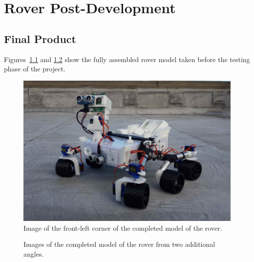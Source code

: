 \chapter{Rover Post-Development}
\label{chap:roverPostDev}
  \section{Final Product}
    Figures~\ref{fig:postDev-finalFull} and \ref{fig:postDev-finalViews} show the fully assembled rover model taken before the testing phase of the project.
    
    \begin{figure}[h!]
      \centering
      \includegraphics[width=0.9\linewidth]{figures/postDev-finalFull}
      \caption[Image of the front-left corner of the completed model of the rover.]{Image of the front-left corner of the completed model of the rover.}
      \label{fig:postDev-finalFull}
    \end{figure}
    
    \begin{figure}[H]
      \centering
      \caption[Images of the completed model of the rover from two additional angles.]{Images of the completed model of the rover from two additional angles.}
      \label{fig:postDev-finalViews}
    \end{figure}
    
